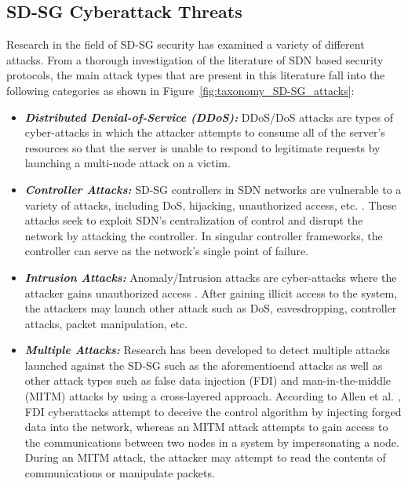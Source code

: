 \documentclass[conference]{IEEEtran}
\begin{document}
\subsection{SD-SG Cyberattack Threats}
\label{sdnsecurity}




Research in the field of SD-SG security has examined a variety of different attacks. From a thorough investigation of the literature of SDN based security protocols, the main attack types that are present in this literature fall into the following categories as shown in Figure~\ref{fig:taxonomy_SD-SG_attacks}:
\begin{itemize}
    \item \textbf{\emph{Distributed Denial-of-Service (DDoS):}} DDoS/DoS attacks are types of cyber-attacks in which the attacker attempts to consume all of the server's resources so that the server is unable to respond to legitimate requests by launching a multi-node attack on a victim\cite{ahmed2019detection}.
    \item \textbf{\emph{Controller Attacks:}} SD-SG controllers in SDN networks are vulnerable to a variety of attacks, including DoS, hijacking, unauthorized access, etc. \cite{santos2020machine, maleh2022comprehensive}. These attacks seek to exploit SDN's centralization of control and disrupt the network by attacking the controller. In singular controller frameworks, the controller can serve as the network's single point of failure.
    \item \textbf{\emph{Intrusion Attacks:}} Anomaly/Intrusion attacks are cyber-attacks where the attacker gains unauthorized access \cite{sultana2019survey}. After gaining illicit access to the system, the attackers may launch other attack such as DoS, eavesdropping, controller attacks, packet manipulation, etc. 
    \item \textbf{\emph{Multiple Attacks:}} Research has been developed to detect multiple attacks launched against the SD-SG such as the aforementioend attacks as well as other attack types such as false data injection (FDI) and man-in-the-middle (MITM) attacks by using a cross-layered approach. According to Allen et al. \cite{starke2022cross}, FDI cyberattacks attempt to deceive the control algorithm by injecting forged data into the network, whereas an MITM attack attempts to gain access to the communications between two nodes in a system by impersonating a node. During an MITM attack, the attacker may attempt to read the contents of communications or manipulate packets. 
    
    
\end{itemize}
\end{document}
